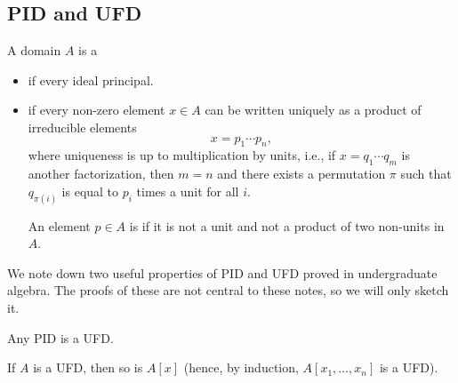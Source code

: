 \subsection{PID and UFD}
\begin{definition}
    A domain $A$ is a 
    \begin{itemize}
    \item {}
    if every ideal principal.
    \item {}
    if every non-zero element $x\in A$ 
    can be written uniquely as a product of irreducible
    elements 
    $$x = p_1\cdots p_n,$$
    where uniqueness is up to multiplication by units,
    i.e., if $x=q_1\cdots q_m$ is another factorization,
    then $m=n$ and there exists a permutation $\pi$
    such that $q_{\pi(i)}$ is equal to $p_i$ times a unit
    for all $i$.

    An element $p\in A$ is  if it is 
    not a unit and not 
    a product of two non-units in $A$.
    \end{itemize}
\end{definition}
We note down two useful properties of PID and UFD proved in
undergraduate algebra. The proofs of these 
are not central to these notes, so we will only sketch it.
\begin{theorem}
    \label{thm:ufd_properties}
    \begin{alphenum}
    \item Any PID is a UFD.
    \item If $A$ is a UFD, then so is $A[x]$
    (hence, by induction, $A[x_1,\dots,x_n]$ is a UFD).
    \end{alphenum}
\end{theorem}
